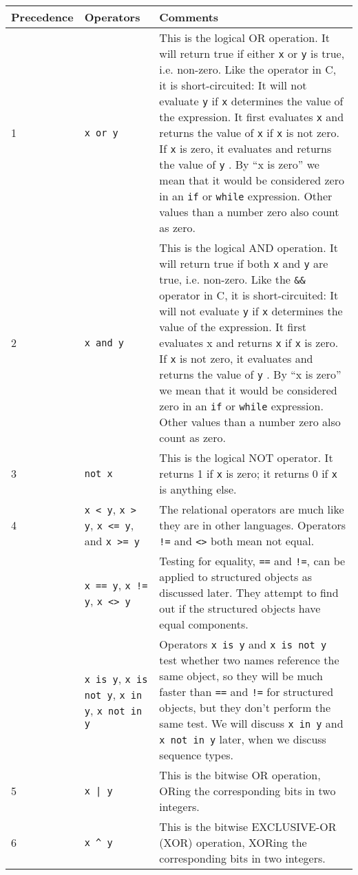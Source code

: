 \begin{longtable}{l|p{3cm}|p{7cm}}
\toprule
Precedence & Operators & Comments \\
\midrule
  1 & \texttt{x or y} &  This is the logical OR operation.
It will return true if either \texttt{x} or \texttt{y} is true, i.e.
non-zero. Like the \texttt{\textbar{}\textbar{}} operator in C, it is
short-circuited: It will not evaluate \texttt{y} if \texttt{x} determines
the value of the expression. It first evaluates \texttt{x} and returns the
value of \texttt{x} if \texttt{x} is not zero. If \texttt{x} is zero, it
evaluates and returns the value of \texttt{y} . By ``x is zero'' we mean
that it would be considered zero in an \texttt{if} or \texttt{while}
expression. Other values than a number zero also count as zero. \\
%
\midrule
  2 & \texttt{x and y} & This is the logical AND operation.
It will return true if both \texttt{x} and \texttt{y} are true, i.e.
non-zero. Like the \texttt{\&\&} operator in C, it is short-circuited: It
will not evaluate \texttt{y} if \texttt{x} determines the value of the
expression. It first evaluates x and returns \texttt{x} if \texttt{x} is
zero. If \texttt{x} is not zero, it evaluates and returns the value of
\texttt{y} . By ``x is zero'' we mean that it would be considered zero in
an \texttt{if} or \texttt{while} expression. Other values than a number zero
also count as zero. \\
%
\midrule
  3 & \texttt{not x} & This is the logical NOT operator. 
It returns 1 if \texttt{x} is zero; it returns 0 if \texttt{x} is anything
else. \\
%
\midrule
  4 & \verb"x < y", \verb"x > y", \verb"x <= y", and \verb"x >= y"  & The relational operators are much
like they are in other languages. Operators \verb"!=" and \verb"<>" both mean not equal. \\
%
   & \verb"x == y", \verb"x != y", \verb"x <> y"  & Testing for equality, \verb"==" and \verb"!=", can be applied to structured objects as discussed later.
They attempt to find out if the structured objects have equal
components. \\
%
   & \verb"x is y", \verb"x is not y", \verb"x in y", \verb"x not in y"  & Operators \verb"x is y" and \verb"x is not y"
test whether two names reference the same object, so they will be much
faster than \verb"==" and \verb"!=" for structured objects, but they don't perform the
same test.  We will discuss \verb"x in y" and \verb"x not in y" later, when we discuss sequence types.\\
%
\midrule
  5 & \verb"x | y" &  This is the bitwise OR operation,
ORing the corresponding bits in two integers. \\
%
\midrule
  6  & \verb"x ^ y" & This is the bitwise EXCLUSIVE-OR (XOR) operation, XORing the corresponding bits in two integers. \\
%
\midrule


\end{longtable}
